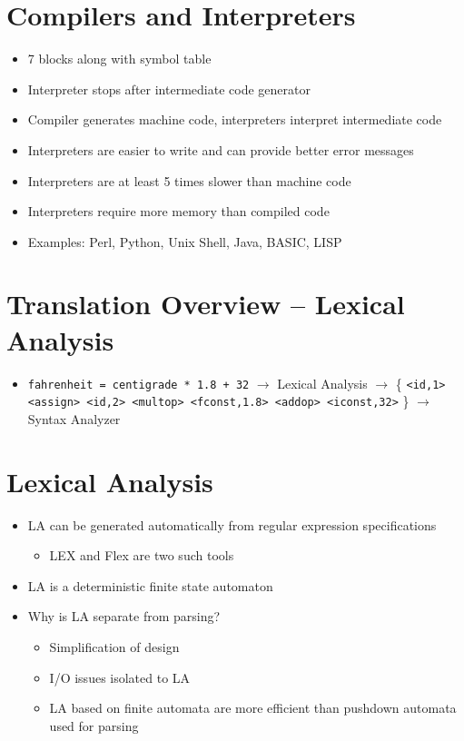\documentclass[a4paper,12pt]{article}
\begin{document}
\section{Compilers and Interpreters}
\begin{itemize}[leftmargin=1.5em]
    \item 7 blocks along with symbol table
    \item Interpreter stops after intermediate code generator
    \item Compiler generates machine code, interpreters interpret intermediate code
    \item Interpreters are easier to write and can provide better error messages
    \item Interpreters are at least 5 times slower than machine code
    \item Interpreters require more memory than compiled code
    \item Examples: Perl, Python, Unix Shell, Java, BASIC, LISP
\end{itemize}

\section{Translation Overview – Lexical Analysis}
\begin{itemize}[leftmargin=1.5em]
    \item \texttt{fahrenheit = centigrade * 1.8 + 32} $\rightarrow$ Lexical Analysis $\rightarrow$ \{ \texttt{<id,1> <assign> <id,2> <multop> <fconst,1.8> <addop> <iconst,32>} \} $\rightarrow$ Syntax Analyzer
\end{itemize}

\section{Lexical Analysis}
\begin{itemize}[leftmargin=1.5em]
    \item LA can be generated automatically from regular expression specifications
    \begin{itemize}
        \item LEX and Flex are two such tools
    \end{itemize}
    \item LA is a deterministic finite state automaton
    \item Why is LA separate from parsing?
    \begin{itemize}
        \item Simplification of design
        \item I/O issues isolated to LA
        \item LA based on finite automata are more efficient than pushdown automata used for parsing
    \end{itemize}
\end{itemize}
\end{document}
